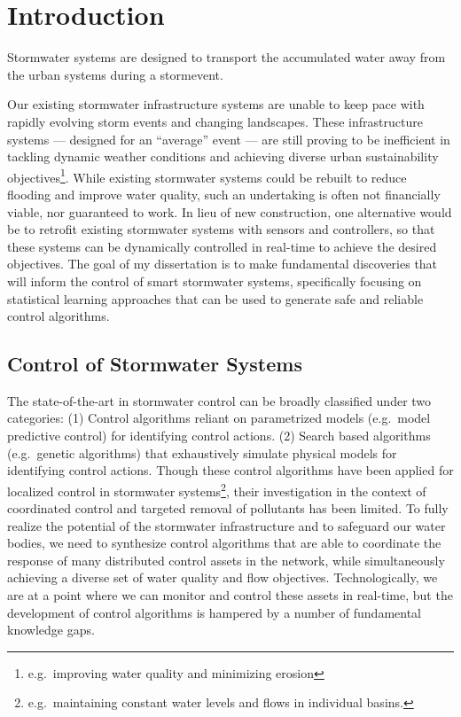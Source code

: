 \chapter{Introduction}\label{ch:introduction}
Stormwater systems are designed to transport the accumulated water away from the urban systems during a stormevent.



Our existing stormwater infrastructure systems are unable to keep pace with rapidly evolving storm events and changing landscapes.
These infrastructure systems --- designed for an ``average'' event --- are still proving to be inefficient in tackling dynamic weather conditions and achieving diverse urban sustainability objectives\footnote{e.g.\ improving water quality and minimizing erosion}.
While existing stormwater systems could be rebuilt to reduce flooding and improve water quality, such an undertaking is often not financially viable, nor guaranteed to work.
In lieu of new construction, one alternative would be to retrofit  existing stormwater systems with sensors and controllers, so that these systems can be dynamically controlled in real-time to achieve the desired objectives.
The goal of my dissertation is to make fundamental discoveries that will inform the control of smart stormwater systems, specifically focusing on statistical learning approaches that can be used to generate safe and reliable control algorithms.


\section{Control of Stormwater Systems} 
\noindent The state-of-the-art in stormwater control  can be broadly classified under two categories: (1) Control algorithms reliant on parametrized models (e.g.\ model predictive control) for identifying control actions. (2) Search based algorithms (e.g.\ genetic algorithms) that exhaustively simulate physical models for identifying control actions.
Though these control algorithms have been applied for localized control in stormwater systems\footnote{e.g.\ maintaining constant water levels and flows in individual basins.}, their investigation in the context of coordinated control and targeted removal of pollutants has been limited.
To fully realize the potential of the stormwater infrastructure and to safeguard our water bodies, we need to synthesize control algorithms that are able to coordinate the response of many distributed control assets in the network, while simultaneously achieving a diverse set of water quality and flow objectives. 
Technologically, we are at a point where we can monitor and control these assets in real-time, but the development of control algorithms is hampered by a number of fundamental knowledge gaps.

